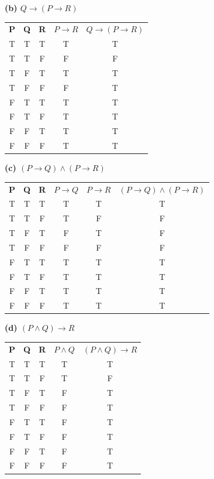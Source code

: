 \documentclass[12pt]{exam}
\begin{document}
\noindent\textbf{(b) $Q \rightarrow (P \rightarrow R)$}
\begin{table}[h]
    \centering 
    \begin{tabular}{ccccc}
        \textbf{P} & \textbf{Q} & \textbf{R} & \textbf{$P \rightarrow R$} & \textbf{$Q \rightarrow (P \rightarrow R)$} \\
        T & T & T & T & T \\
        T & T & F & F & F \\
        T & F & T & T & T \\
        T & F & F & F & T \\
        F & T & T & T & T \\
        F & T & F & T & T \\
        F & F & T & T & T \\
        F & F & F & T & T \\
    \end{tabular}
\end{table}

\noindent\textbf{(c) $(P \rightarrow Q) \land (P \rightarrow R)$}
\begin{table}[h]
    \centering 
    \begin{tabular}{cccccc}
        \textbf{P} & \textbf{Q} & \textbf{R} & \textbf{$P \rightarrow Q$} & \textbf{$P \rightarrow R$} & \textbf{$(P \rightarrow Q) \land (P \rightarrow R)$} \\
        T & T & T & T & T & T \\
        T & T & F & T & F & F \\
        T & F & T & F & T & F \\
        T & F & F & F & F & F \\
        F & T & T & T & T & T \\
        F & T & F & T & T & T \\
        F & F & T & T & T & T \\
        F & F & F & T & T & T \\
    \end{tabular}
\end{table}

\noindent\textbf{(d) $(P \land Q) \rightarrow R$}
\begin{table}[h]
    \centering 
    \begin{tabular}{ccccc}
        \textbf{P} & \textbf{Q} & \textbf{R} & \textbf{$P \land Q$} & \textbf{$(P \land Q) \rightarrow R$} \\
        T & T & T & T & T \\
        T & T & F & T & F \\
        T & F & T & F & T \\
        T & F & F & F & T \\
        F & T & T & F & T \\
        F & T & F & F & T \\
        F & F & T & F & T \\
        F & F & F & F & T \\
    \end{tabular}
\end{table}
\end{document}
